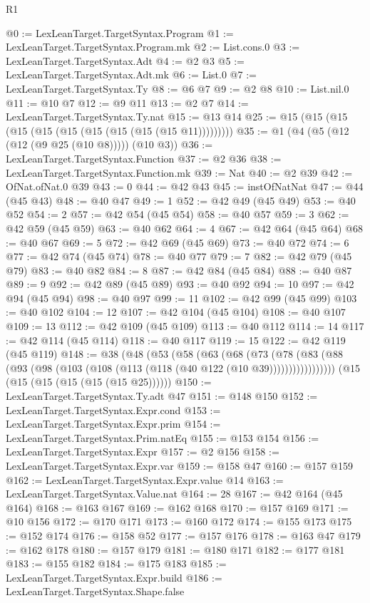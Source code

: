 \begin{lexlean}{R1}
\begin{coremodule}
@0 := LexLeanTarget.TargetSyntax.Program
@1 := LexLeanTarget.TargetSyntax.Program.mk
@2 := List.cons.{0}
@3 := LexLeanTarget.TargetSyntax.Adt
@4 := @2 @3
@5 := LexLeanTarget.TargetSyntax.Adt.mk
@6 := List.{0}
@7 := LexLeanTarget.TargetSyntax.Ty
@8 := @6 @7
@9 := @2 @8
@10 := List.nil.{0}
@11 := @10 @7
@12 := @9 @11
@13 := @2 @7
@14 := LexLeanTarget.TargetSyntax.Ty.nat
@15 := @13 @14
@25 := @15 (@15 (@15 (@15 (@15 (@15 (@15 (@15 (@15 (@15 @11)))))))))
@35 := @1 (@4 (@5 (@12 (@12 (@9 @25 (@10 @8))))) (@10 @3))
@36 := LexLeanTarget.TargetSyntax.Function
@37 := @2 @36
@38 := LexLeanTarget.TargetSyntax.Function.mk
@39 := Nat
@40 := @2 @39
@42 := OfNat.ofNat.{0} @39
@43 := 0
@44 := @42 @43
@45 := instOfNatNat
@47 := @44 (@45 @43)
@48 := @40 @47
@49 := 1
@52 := @42 @49 (@45 @49)
@53 := @40 @52
@54 := 2
@57 := @42 @54 (@45 @54)
@58 := @40 @57
@59 := 3
@62 := @42 @59 (@45 @59)
@63 := @40 @62
@64 := 4
@67 := @42 @64 (@45 @64)
@68 := @40 @67
@69 := 5
@72 := @42 @69 (@45 @69)
@73 := @40 @72
@74 := 6
@77 := @42 @74 (@45 @74)
@78 := @40 @77
@79 := 7
@82 := @42 @79 (@45 @79)
@83 := @40 @82
@84 := 8
@87 := @42 @84 (@45 @84)
@88 := @40 @87
@89 := 9
@92 := @42 @89 (@45 @89)
@93 := @40 @92
@94 := 10
@97 := @42 @94 (@45 @94)
@98 := @40 @97
@99 := 11
@102 := @42 @99 (@45 @99)
@103 := @40 @102
@104 := 12
@107 := @42 @104 (@45 @104)
@108 := @40 @107
@109 := 13
@112 := @42 @109 (@45 @109)
@113 := @40 @112
@114 := 14
@117 := @42 @114 (@45 @114)
@118 := @40 @117
@119 := 15
@122 := @42 @119 (@45 @119)
@148 := @38
    (@48
      (@53
        (@58
          (@63
            (@68
              (@73
                (@78 (@83 (@88 (@93 (@98 (@103 (@108 (@113 (@118 (@40 @122 (@10 @39)))))))))))))))))
    (@15 (@15 (@15 (@15 (@15 (@15 @25))))))
@150 := LexLeanTarget.TargetSyntax.Ty.adt @47
@151 := @148 @150
@152 := LexLeanTarget.TargetSyntax.Expr.cond
@153 := LexLeanTarget.TargetSyntax.Expr.prim
@154 := LexLeanTarget.TargetSyntax.Prim.natEq
@155 := @153 @154
@156 := LexLeanTarget.TargetSyntax.Expr
@157 := @2 @156
@158 := LexLeanTarget.TargetSyntax.Expr.var
@159 := @158 @47
@160 := @157 @159
@162 := LexLeanTarget.TargetSyntax.Expr.value @14
@163 := LexLeanTarget.TargetSyntax.Value.nat
@164 := 28
@167 := @42 @164 (@45 @164)
@168 := @163 @167
@169 := @162 @168
@170 := @157 @169
@171 := @10 @156
@172 := @170 @171
@173 := @160 @172
@174 := @155 @173
@175 := @152 @174
@176 := @158 @52
@177 := @157 @176
@178 := @163 @47
@179 := @162 @178
@180 := @157 @179
@181 := @180 @171
@182 := @177 @181
@183 := @155 @182
@184 := @175 @183
@185 := LexLeanTarget.TargetSyntax.Expr.build
@186 := LexLeanTarget.TargetSyntax.Shape.false

\end{coremodule}
\end{lexlean}
